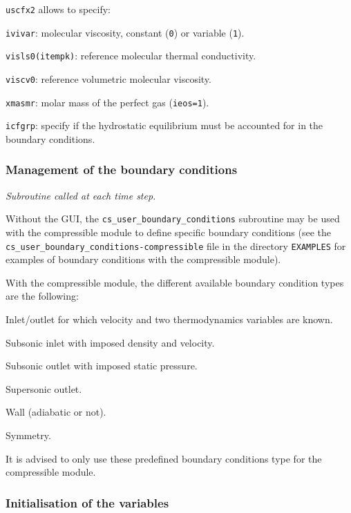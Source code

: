 {{\texttt{uscfx2} allows to specify:
\begin{list}{-}{}
  \item \texttt{ivivar}: molecular viscosity, constant (\texttt{0}) or variable (\texttt{1}).
  \item \texttt{visls0(itempk)}: reference molecular thermal conductivity.
  \item \texttt{viscv0}: reference volumetric molecular viscosity.
  \item \texttt{xmasmr}: molar mass of the perfect gas (\texttt{ieos=1}).
  \item \texttt{icfgrp}: specify if the hydrostatic equilibrium must be accounted for in the
                         boundary conditions.
\end{list}

\subsubsection{Management of the boundary conditions}

\noindent
\textit{Subroutine called at each time step.}

Without the GUI, the \texttt{cs\_user\_boundary\_conditions} subroutine may be used with
the compressible module to define specific boundary conditions
(see the \texttt{cs\_user\_boundary\_conditions-compressible} file in the directory \texttt{EXAMPLES}
for examples of boundary conditions with the compressible module).

With the compressible module, the different available boundary condition types
are the following:

\begin{list}{-}{}
  \item Inlet/outlet for which velocity and two thermodynamics variables are known.
  \item Subsonic inlet with imposed density and velocity.
  \item Subsonic outlet with imposed static pressure.
  \item Supersonic outlet.
  \item Wall (adiabatic or not).
  \item Symmetry.
\end{list}

It is advised to only use these predefined boundary conditions type for the compressible module.

\subsubsection{Initialisation of the variables}

}}
